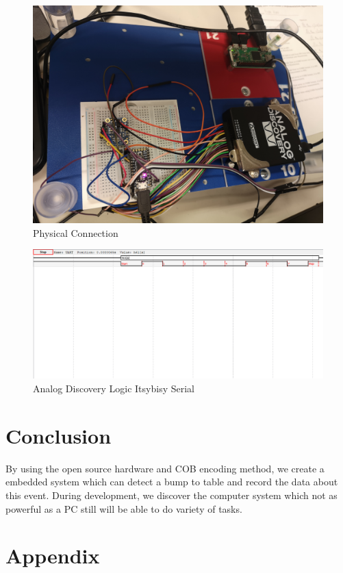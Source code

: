\documentclass{article}
\begin{document}
	\begin{figure}[hb]
		\includegraphics[width=\textwidth]{img/Lab2_Arduino-rbp_2.jpg}
		\caption{Physical Connection} 
		\label{ana_ardu2}
	\end{figure}
	\begin{figure}[hb]
		\includegraphics[width=\textwidth]{img/Lab3_ArduinosendChar.PNG}
		\caption{Analog Discovery Logic Itsybisy Serial} 
		\label{ana_ardu3}
	\end{figure}
	\clearpage
	\section{Conclusion}
	By using the open source hardware and COB encoding method, we create a embedded system which can detect a bump to table and record the data about this event. During development, we discover the computer system which not as powerful as a PC still will be able to do variety of tasks.
	\section{Appendix}
\end{document}
